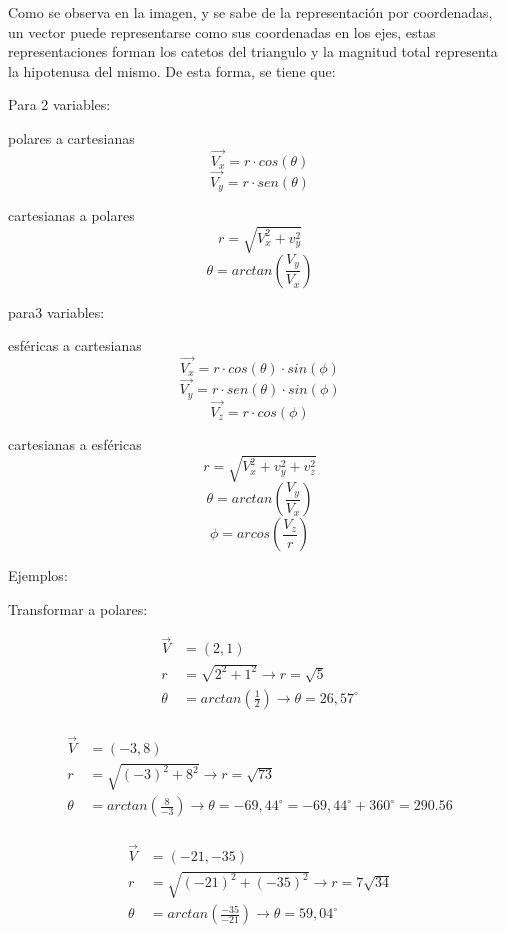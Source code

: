     Como se observa en la imagen, y se sabe de la representación por
    coordenadas, un vector puede representarse como sus coordenadas en los
    ejes, estas representaciones forman los catetos del triangulo y la magnitud
    total representa la hipotenusa del mismo. De esta forma, se tiene que:

    Para 2 variables:

    polares a cartesianas
    $$\vec{V_x}= r\cdot cos(\theta)$$
    $$\vec{V_y} =  r\cdot sen(\theta)$$

    cartesianas a polares
    $$ r = \sqrt{V_x ^2+v_y^2}$$
    $$\theta= arctan\left(\frac{V_y}{V_x}\right)$$



    para3 variables:

    esféricas a cartesianas
    $$\vec{V_x}= r\cdot cos(\theta) \cdot sin(\phi)$$
    $$\vec{V_y} = r\cdot sen(\theta)\cdot sin(\phi)$$
    $$\vec{V_z}=r\cdot cos(\phi)$$

    cartesianas a esféricas
    $$ r = \sqrt{V_x ^2+v_y^2+v_z^2}$$
    $$\theta= arctan\left(\frac{V_y}{V_x}\right)$$
    $$\phi = arcos\left(\frac{V_z}{r}\right)$$


    Ejemplos:


    Transformar a polares:

     \begin{align*}
         \vec{V}&=(2,1) \\
         r &= \sqrt{2^2+1^2}  \rightarrow r= \sqrt{5} \\
         \theta&= arctan\left(\frac{1}{2}\right)  \rightarrow \theta= 26,57 ^\circ \\
    \end{align*}

     \begin{align*}
         \vec{V}&=(-3,8) \\
         r &= \sqrt{(-3)^2+8^2} \rightarrow r= \sqrt{73} \\
         \theta&= arctan\left(\frac{8}{-3}\right)  \rightarrow \theta= -69,44^\circ =-69,44^\circ+360^\circ=290.56 \\
    \end{align*}

     \begin{align*}
         \vec{V}&=(-21,-35) \\
         r &= \sqrt{(-21)^2+(-35)^2}  \rightarrow r= 7\sqrt{34} \\
         \theta&= arctan\left(\frac{-35}{-21}\right)  \rightarrow \theta= 59,04^\circ\\
    \end{align*}

